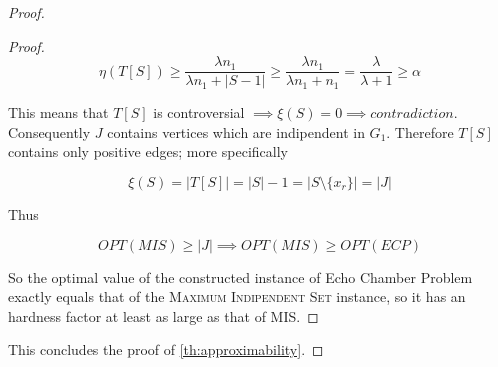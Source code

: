 \documentclass{article}
\begin{document}
\begin{proof}
\begin{proof}
		\begin{equation}
			\eta(T[S]) \geq \frac{\lambda n_1}{\lambda n_1 + |S-1|} \geq \frac{\lambda n_1}{\lambda n_1 + n_1} = \frac{\lambda
			}{\lambda + 1} \geq \alpha
		\end{equation}

		This means that $T[S]$ is controversial $\implies \xi(S) = 0
			\implies contradiction$. Consequently $J$
		contains vertices which are indipendent in $G_1$. Therefore $T[S]$ contains
		only positive edges; more specifically

		\begin{equation}
			\xi(S) = |T[S]| = |S| - 1 = |S \setminus \{x_r\}| = |J|
		\end{equation}

		Thus

		\begin{equation}
			OPT(MIS) \geq |J| \implies OPT(MIS) \geq OPT(ECP)
		\end{equation}

		So the optimal value of the constructed instance of Echo Chamber Problem
		exactly equals that of the \textsc{Maximum Indipendent Set} instance, so it
		has an hardness factor at least as large as that of MIS.
	\end{proof}

	This concludes the proof of \autoref{th:approximability}.
\end{proof}
\end{document}
